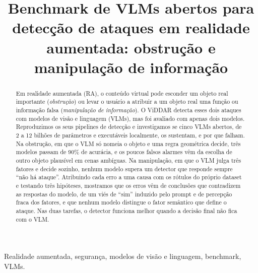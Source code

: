 \documentclass[conference]{IEEEtran}
\begin{document}
\title{Benchmark de VLMs abertos para detecção de ataques em realidade aumentada: obstrução e
manipulação de informação}

\author{
\and
{}
}

\maketitle

\begin{abstract}
Em realidade aumentada (RA), o conteúdo virtual pode esconder um objeto real importante
(\emph{obstrução}) ou levar o usuário a atribuir a um objeto real uma função ou informação falsa
(\emph{manipulação de informação}). O ViDDAR detecta esses dois ataques com modelos de visão e
linguagem (VLMs), mas foi avaliado com apenas dois modelos. Reproduzimos os seus
pipelines de detecção e investigamos se cinco VLMs abertos, de 2 a 12 bilhões de parâmetros e
executáveis localmente, os sustentam, e por que falham. Na obstrução, em que o VLM só nomeia o objeto e
uma regra geométrica decide, três modelos passam de 90\% de acurácia, e os poucos falsos alarmes vêm da
escolha de outro objeto plausível em cenas ambíguas. Na manipulação, em que o VLM julga três fatores e
decide sozinho, nenhum modelo supera um detector que responde sempre ``não há ataque''. Atribuindo cada
erro a uma causa com os rótulos do próprio dataset e testando três hipóteses, mostramos que os erros vêm
de conclusões que contradizem as respostas do modelo, de um viés de ``sim'' induzido pelo prompt e de
percepção fraca dos fatores, e que nenhum modelo distingue o fator semântico que define o ataque. Nas
duas tarefas, o detector funciona melhor quando a decisão final não fica com o VLM.
\end{abstract}

\begin{IEEEkeywords}
Realidade aumentada, segurança, modelos de visão e linguagem, benchmark, VLMs.
\end{IEEEkeywords}
\end{document}
